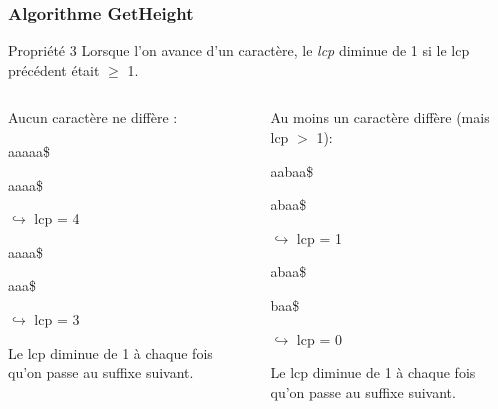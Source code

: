 \documentclass[10pt]{beamer}
\begin{document}
\begin{frame}

  \frametitle{Algorithme GetHeight}
  
  
  \begin{block}{Propriété 3}
    Lorsque l'on avance d'un caractère, le \textit{lcp} diminue de 1
    si le lcp précédent était $\geq$ 1. 
  \end{block}
  
  \pause

  \begin{columns}
    \begin{column}{.48\textwidth}
      
      Aucun caractère ne diffère :
      
      aaaaa\$

      aaaa\$

      $\hookrightarrow$ lcp = 4

      aaaa\$

      aaa\$

      $\hookrightarrow$ lcp = 3

      
      Le lcp diminue de 1 à chaque fois qu'on passe au suffixe suivant.
      
    \end{column}%
    \hfill%
    \pause
    \begin{column}{.48\textwidth}
        
      Au moins un caractère diffère (mais lcp $>$ 1):
      
        aabaa\$

        abaa\$

        $\hookrightarrow$ lcp = 1

        abaa\$

        baa\$

        $\hookrightarrow$ lcp = 0
        
        Le lcp diminue de 1 à chaque fois qu'on passe au suffixe suivant.
        
      \end{column}%
      \end{columns}
  
\end{frame}

%
%
\end{document}
